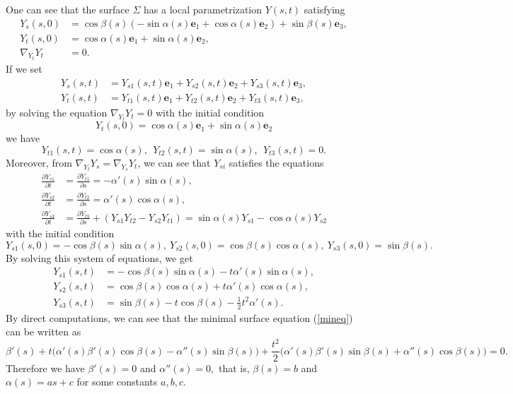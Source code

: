 \documentclass[11pt]{amsart}
\begin{document}
\noindent[Proof] One can see that the surface $\Sigma$ has a local
parametrization $Y(s,t)$ satisfying
\begin{equation}\label{eq:horizparam}
\begin{split}
   Y_s (s,0) &=\cos\beta(s)(-\sin \alpha (s){\mathbf{e}}_1 + \cos\alpha (s){\mathbf{e}}_2)
               + \sin\beta(s){\mathbf{e}}_3 , \\
   Y_t (s,0) &=\cos\alpha(s){\mathbf{e}}_1 + \sin \alpha (s){\mathbf{e}}_2,   \\
   \nabla_{Y_t} Y_t &=0.
\end{split}
\end{equation}
If we set
\[
   \begin{aligned}
    Y_s(s,t) &= Y_{s1}(s,t){\mathbf{e}}_1 + Y_{s2}(s,t){\mathbf{e}}_2 + Y_{s3}(s,t){\mathbf{e}}_3, \\
    Y_t(s,t) &= Y_{t1}(s,t){\mathbf{e}}_1 + Y_{t2}(s,t){\mathbf{e}}_2 + Y_{t3}(s,t){\mathbf{e}}_3,
   \end{aligned}
\]
by solving the equation $\nabla_{Y_t} Y_t =0$ with the initial
condition
$$Y_t(s,0)=\cos\alpha(s){\mathbf{e}}_1 + \sin \alpha(s){\mathbf{e}}_2 $$
we have
\[   Y_{t1} (s,t) = \cos\alpha(s),\ \
     Y_{t2} (s,t) = \sin \alpha(s),\ \
     Y_{t3} (s,t) = 0.      \]
Moreover, from $\nabla_{Y_t} Y_s = \nabla_{Y_s} Y_t$, we can see
that $Y_{si}$ satisfies the equations
\[  \begin{split}
         \frac{\partial Y_{s1}}{\partial t} &= \frac{\partial Y_{t1}}{\partial s}
             =-\alpha'(s)\sin\alpha(s), \\
     \frac{\partial Y_{s2}}{\partial t} &= \frac{\partial Y_{t2}}{\partial s}
             =\alpha'(s)\cos\alpha(s),  \\
     \frac{\partial Y_{s3}}{\partial t}
             &= \frac{\partial Y_{t3}}{\partial s} + (Y_{s1}Y_{t2} - Y_{s2}Y_{t1})
              = \sin \alpha(s)Y_{s1} - \cos\alpha(s)Y_{s2}
\end{split}       \]
with the initial condition
\[  Y_{s1}(s,0)=-\cos\beta(s)\sin\alpha(s), \
    Y_{s2}(s,0)= \cos\beta(s)\cos\alpha(s), \
    Y_{s3}(s,0)= \sin\beta(s).  \]
By solving this system of equations, we get
\[  \begin{split}
    Y_{s1}(s,t)&= -\cos\beta(s)\sin\alpha(s)-t\alpha'(s)\sin\alpha(s),\\
    Y_{s2}(s,t)&=  \cos\beta(s)\cos\alpha(s)+t\alpha'(s)\cos\alpha(s),\\
    Y_{s3}(s,t)&= \sin\beta(s)-t\cos\beta(s)-\frac12 t^2\alpha'(s).
\end{split}       \]
By direct computations, we can see that the minimal surface
equation (\ref{mineq}) can be written as
\[
\beta'(s)
         +t\big(\alpha'(s)\beta'(s)\cos\beta(s)-\alpha''(s)\sin\beta(s)\big)
    +\frac{t^2}2 \big(\alpha'(s)\beta'(s)\sin\beta(s)+\alpha''(s)\cos\beta(s)\big)
    =0.
\]
Therefore we have $\beta'(s)=0$ and $\alpha''(s)=0,$ that is,
$\beta(s)=b$ and $\alpha(s)=as+c$ for some constants $a,b,c.$
\end{document}
